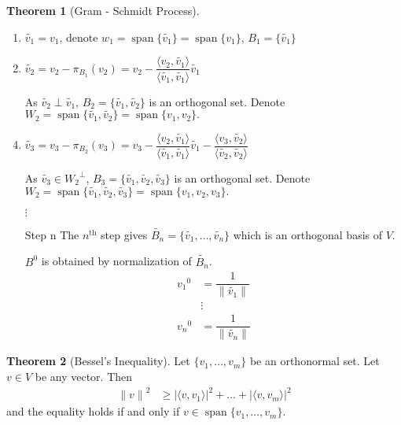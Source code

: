 \documentclass[fleqn, a5paper, 10pt]{amsart}
\DeclareMathOperator{\vspan}{\mathrm{span}} %
\theoremstyle{definition}
\theoremstyle{theorem}
\newtheorem{theorem}{Theorem} %
\theoremstyle{remark}
\numberwithin{corollary}{theorem}
\numberwithin{equation}{theorem}
\begin{document}
\begin{theorem}[Gram - Schmidt Process]
	~\\
	\begin{enumerate}[label=Step \arabic*]
		\item $\widetilde{v_1} = v_1$, denote $w_1 = \vspan\{\widetilde{v_1}\} = \vspan\{v_1\}$, $B_1 = \{\widetilde{v_1}\}$
		\item $\widetilde{v_2} = v_2 - \pi_{B_1}(v_2) = v_2 - \dfrac{\langle v_2, \widetilde{v_1}\rangle}{\langle \widetilde{v_1}, \widetilde{v_1} \rangle} \widetilde{v_1}$
		\item[] As $\widetilde{v_2} \perp \widetilde{v_1}$, $B_2 = \{\widetilde{v_1}, \widetilde{v_2}\}$ is an orthogonal set. Denote $W_2 = \vspan \{\widetilde{v_1}, \widetilde{v_2}\} = \vspan \{v_1, v_2\}.$
		\item $\widetilde{v_3} = v_3 - \pi_{B_2}(v_3) = v_3 - \dfrac{\langle v_2, \widetilde{v_1} \rangle}{\langle \widetilde{v_1}, \widetilde{v_1} \rangle} \widetilde{v_1} - \dfrac{\langle v_3, \widetilde{v_2} \rangle}{\langle \widetilde{v_2}, \widetilde{v_2} \rangle}$
		\item[] As $\widetilde{v_3} \in {W_2}^{\perp}$, $B_3 = \{\widetilde{v_1}, \widetilde{v_2}, \widetilde{v_3}\}$ is an orthogonal set. Denote $W_2 = \vspan \{\widetilde{v_1}, \widetilde{v_2}, \widetilde{v_3}\} = \vspan \{v_1, v_2, v_3\}.$
		\item[] $\vdots$
		\item[Step n] The $n^{\text{th}}$ step gives $\widetilde{B_n} = \{\widetilde{v_1}, \dots, \widetilde{v_n}\}$ which is an orthogonal basis of $V$.
		\item[] $B^0$ is obtained by normalization of $\widetilde{B_n}$.\\
			\begin{align*}
				{v_1}^0 &= \dfrac{1}{\|\widetilde{v_1}\|}\\
				&\vdots\\
				{v_n}^0 &= \dfrac{1}{\|\widetilde{v_n}\|}
			\end{align*}
	\end{enumerate}
\end{theorem}

\begin{theorem}[Bessel's Inequality]\label{Bessel's Inequality}
	Let $\{v_1, \dots, v_m\}$ be an orthonormal set. Let $v \in V$ be any vector. Then
	\begin{align*}
		{\| v \|}^2 &\geq {|\langle v, v_1 \rangle|}^2 + \dots + {|\langle v, v_m \rangle|}^2		
	\end{align*}
	and the equality holds if and only if $v \in \vspan \{v_1, \dots, v_m\}$.
\end{theorem}
\end{document}
